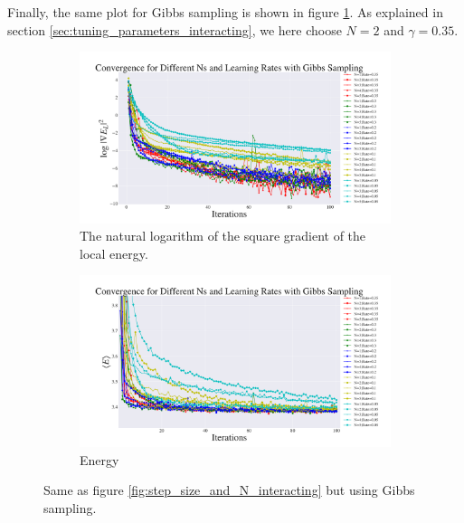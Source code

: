 \documentclass[a4paper, 10pt]{article}
\begin{document}
\linebreak
Finally, the same plot for Gibbs sampling is shown in figure \ref{fig:step_size_and_N_gibbs_interacting}. As explained in section \ref{sec:tuning_parameters_interacting}, we here choose $N=2$ and $\gamma=0.35$.
\begin{figure}[ht!]
	\centering
\begin{subfigure}[t]{.9\textwidth}
	\centering
	\includegraphics[width=\textwidth]{../Results/grad_gibbs_interacting.pdf}
	\caption{The natural logarithm of the square gradient of the local energy.}
\end{subfigure}%

\begin{subfigure}[b]{.9\textwidth}
	\centering
	\includegraphics[width=\textwidth]{../Results/energy_gibbs_interacting.pdf}
	\caption{Energy}
\end{subfigure}%
	\caption{Same as figure \ref{fig:step_size_and_N_interacting} but using Gibbs sampling.}\label{fig:step_size_and_N_gibbs_interacting}
\end{figure}\\
\linebreak
\clearpage
\end{document}
